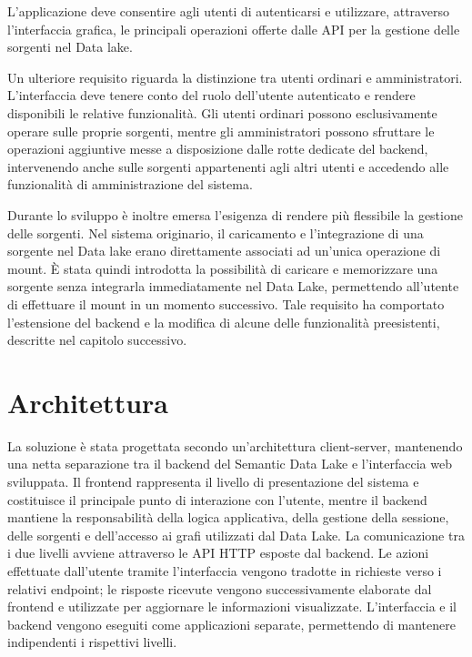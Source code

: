 \documentclass[13.6pt,a4paper]{report}
\begin{document}
\noindent
L'applicazione deve consentire agli utenti di autenticarsi e utilizzare, attraverso l'interfaccia grafica, le principali operazioni offerte dalle API per la gestione delle sorgenti nel Data lake.

\noindent
Un ulteriore requisito riguarda la distinzione tra utenti ordinari e amministratori. L'interfaccia deve tenere conto del ruolo dell'utente autenticato e rendere disponibili le relative funzionalità. Gli utenti ordinari possono esclusivamente operare sulle proprie sorgenti, mentre gli amministratori possono sfruttare le operazioni aggiuntive messe a disposizione dalle rotte dedicate del backend, intervenendo anche sulle sorgenti appartenenti agli altri utenti e accedendo alle funzionalità di amministrazione del sistema.

\noindent
Durante lo sviluppo è inoltre emersa l'esigenza di rendere più flessibile la gestione delle sorgenti. Nel sistema originario, il caricamento e l'integrazione di una sorgente nel Data lake erano direttamente associati ad un'unica operazione di mount. È stata quindi introdotta la possibilità di caricare e memorizzare una sorgente senza integrarla immediatamente nel Data Lake, permettendo all'utente di effettuare il mount in un momento successivo. Tale requisito ha comportato l'estensione del backend e la modifica di alcune delle funzionalità preesistenti, descritte nel capitolo successivo.

\section{Architettura}

La soluzione è stata progettata secondo un'architettura client-server, mantenendo una netta separazione tra il backend del Semantic Data Lake e l'interfaccia web sviluppata. Il frontend rappresenta il livello di presentazione del sistema e costituisce il principale punto di interazione con l'utente, mentre il backend mantiene la responsabilità della logica applicativa, della gestione della sessione, delle sorgenti e dell'accesso ai grafi utilizzati dal Data Lake. La comunicazione tra i due livelli avviene attraverso le API HTTP esposte dal backend. Le azioni effettuate dall'utente tramite l'interfaccia vengono tradotte in richieste verso i relativi endpoint; le risposte ricevute vengono successivamente elaborate dal frontend e utilizzate per aggiornare le informazioni visualizzate. L'interfaccia e il backend vengono eseguiti come applicazioni separate, permettendo di mantenere indipendenti i rispettivi livelli.
\end{document}
